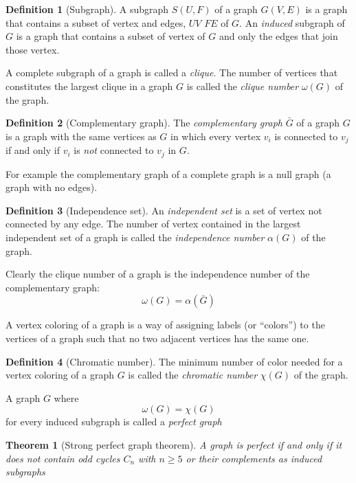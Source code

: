 \documentclass[a4paper]{article}
\newtheorem{theorem}{Theorem}[section]
\theoremstyle{definition}
\newtheorem{definition}{Definition}[section]
\begin{document}
\begin{definition}[Subgraph]
    A subgraph $S(U,F)$ of a graph $G(V,E)$ is a graph that contains a subset of vertex
    and edges, $U V$ $F E$ of $G$. An \emph{induced} subgraph of $G$ is a graph that contains
    a subset of vertex of $G$ and only the edges that join those vertex.
\end{definition}

A complete subgraph of a graph is called a \emph{clique}.
The number of vertices that constitutes the largest clique in a graph $G$ is
called the \emph{clique number} $\omega(G)$ of the graph.

\begin{definition}[Complementary graph]
    The \emph{complementary graph} $\bar G$ of a graph $G$ is a graph with the same
    vertices as $G$ in which every vertex $v_i$ is connected to $v_j$ if and
    only if $v_i$ is \emph{not} connected to $v_j$ in $G$.
\end{definition}
For example the complementary graph of a complete graph is a null graph (a graph
with no edges).

\begin{definition}[Independence set]
    An \emph{independent set} is a set of vertex not connected by any edge.
    The number of vertex contained in the largest independent set of a graph is called the
    \emph{independence number} $\alpha(G)$ of the graph.
\end{definition}
Clearly the clique number of a graph is the independence number of the
complementary graph:
\begin{equation}
    \omega(G) = \alpha(\bar G)    
\end{equation}

A vertex coloring of a graph is a way of assigning labels (or ``colors'') to the vertices of a
graph such that no two adjacent vertices has the same one.
\begin{definition}[Chromatic number]
    The minimum number of color needed for a vertex coloring of a graph
    $G$ is called the \emph{chromatic number} $\chi(G)$ of the graph.
\end{definition}
A graph $G$ where
\begin{equation}
    \omega(G) = \chi(G)
\end{equation}
for every induced subgraph is called a \emph{perfect graph}
\begin{theorem}[Strong perfect graph theorem]
    A graph is perfect if and only if it does not contain odd cycles $C_n$ with
    $n\ge5$ or their complements as induced subgraphs
    \label{th:strong_perfect_graph}
\end{theorem}
\end{document}

